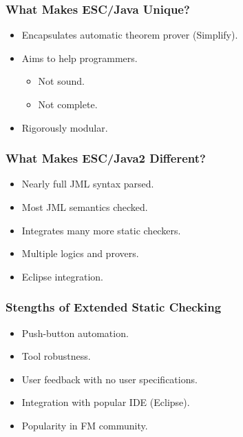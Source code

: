 \begin{frame}
\frametitle{What Makes ESC/Java Unique?}

\begin{itemize}
\item
Encapsulates automatic theorem prover (Simplify).

\item
Aims to help programmers.
\begin{itemize}
\item
Not sound.

\item
Not complete.
\end{itemize}

\item
Rigorously modular.
\end{itemize}
\end{frame}

\begin{frame}
\frametitle{What Makes ESC/Java2 Different?}
\begin{itemize}
\item
Nearly full JML syntax parsed.

\item
Most JML semantics checked.

\item
Integrates many more static checkers.

\item
Multiple logics and provers.

\item
Eclipse integration.
\end{itemize}
\end{frame}

\begin{frame}
\frametitle{Stengths of Extended Static Checking}
\begin{itemize}
\item
Push-button automation.

\item
Tool robustness.

\item
User feedback with no user specifications.

\item
Integration with popular IDE (Eclipse).

\item
Popularity in FM community.
\end{itemize}
\end{frame}

